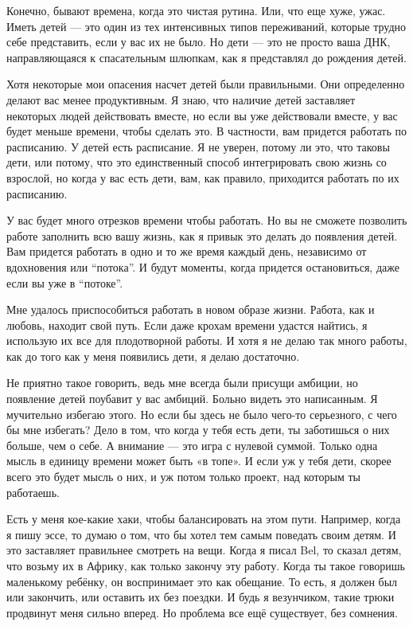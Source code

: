 \documentclass[ebook,12pt,oneside,openany]{memoir}
\begin{document}
Конечно, бывают времена, когда это чистая рутина. Или, что еще хуже,
ужас. Иметь детей — это один из тех интенсивных типов переживаний,
которые трудно себе представить, если у вас их не было. Но дети — это
не просто ваша ДНК, направляющаяся к спасательным шлюпкам, как я
представлял до рождения детей.

Хотя некоторые мои опасения насчет детей были правильными. Они
определенно делают вас менее продуктивным. Я знаю, что наличие детей
заставляет некоторых людей действовать вместе, но если вы уже
действовали вместе, у вас будет меньше времени, чтобы сделать это. В
частности, вам придется работать по расписанию. У детей есть
расписание. Я не уверен, потому ли это, что таковы дети, или потому,
что это единственный способ интегрировать свою жизнь со взрослой, но
когда у вас есть дети, вам, как правило, приходится работать по их
расписанию.

У вас будет много отрезков времени чтобы работать. Но вы не сможете
позволить работе заполнить всю вашу жизнь, как я привык это делать до
появления детей. Вам придется работать в одно и то же время каждый
день, независимо от вдохновения или “потока”. И будут моменты, когда
придется остановиться, даже если вы уже в “потоке”.

Мне удалось приспособиться работать в новом образе жизни. Работа, как
и любовь, находит свой путь. Если даже крохам времени удастся найтись,
я использую их все для плодотворной работы. И хотя я не делаю так
много работы, как до того как у меня появились дети, я делаю
достаточно.

Не приятно такое говорить, ведь мне всегда были присущи амбиции, но
появление детей поубавит у вас амбиций. Больно видеть это написанным.
Я мучительно избегаю этого. Но если бы здесь не было чего-то
серьезного, с чего бы мне избегать? Дело в том, что когда у тебя есть
дети, ты заботишься о них больше, чем о себе. А внимание — это игра с
нулевой суммой. Только одна мысль в единицу времени может быть «в
топе». И если уж у тебя дети, скорее всего это будет мысль о них, и уж
потом только проект, над которым ты работаешь.

Есть у меня кое-какие хаки, чтобы балансировать на этом пути.
Например, когда я пишу эссе, то думаю о том, что бы хотел тем самым
поведать своим детям. И это заставляет правильнее смотреть на вещи.
Когда я писал Bel, то сказал детям, что возьму их в Африку, как только
закончу эту работу. Когда ты такое говоришь маленькому ребёнку, он
воспринимает это как обещание. То есть, я должен был или закончить,
или оставить их без поездки. И будь я везунчиком, такие трюки
продвинут меня сильно вперед. Но проблема все ещё существует, без
сомнения.
\end{document}
